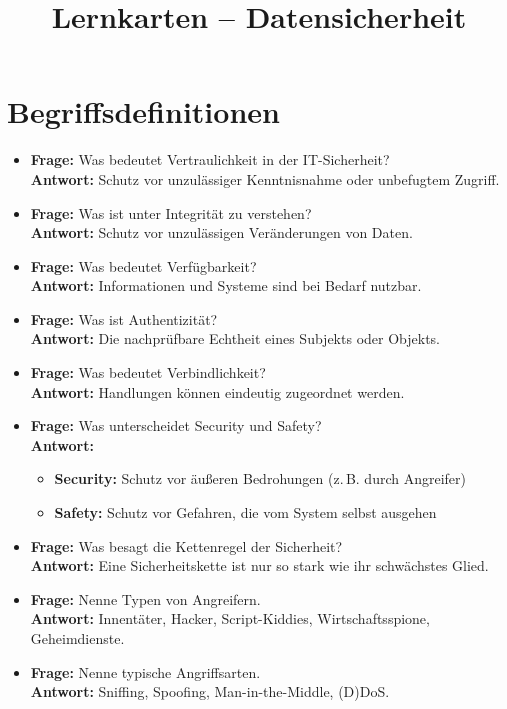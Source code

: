 \documentclass[a4paper,12pt]{article}
\title{Lernkarten – Datensicherheit}
\author{}
\date{}
\begin{document}
\maketitle

\section*{Begriffsdefinitionen}

\begin{itemize}[leftmargin=*]
  \item \textbf{Frage:} Was bedeutet Vertraulichkeit in der IT-Sicherheit?\\
  \textbf{Antwort:} Schutz vor unzulässiger Kenntnisnahme oder unbefugtem Zugriff.

  \item \textbf{Frage:} Was ist unter Integrität zu verstehen?\\
  \textbf{Antwort:} Schutz vor unzulässigen Veränderungen von Daten.

  \item \textbf{Frage:} Was bedeutet Verfügbarkeit?\\
  \textbf{Antwort:} Informationen und Systeme sind bei Bedarf nutzbar.

  \item \textbf{Frage:} Was ist Authentizität?\\
  \textbf{Antwort:} Die nachprüfbare Echtheit eines Subjekts oder Objekts.

  \item \textbf{Frage:} Was bedeutet Verbindlichkeit?\\
  \textbf{Antwort:} Handlungen können eindeutig zugeordnet werden.

  \item \textbf{Frage:} Was unterscheidet Security und Safety?\\
  \textbf{Antwort:} 
  \begin{itemize}
    \item \textbf{Security:} Schutz vor äußeren Bedrohungen (z. B. durch Angreifer)
    \item \textbf{Safety:} Schutz vor Gefahren, die vom System selbst ausgehen
  \end{itemize}

  \item \textbf{Frage:} Was besagt die Kettenregel der Sicherheit?\\
  \textbf{Antwort:} Eine Sicherheitskette ist nur so stark wie ihr schwächstes Glied.

  \item \textbf{Frage:} Nenne Typen von Angreifern.\\
  \textbf{Antwort:} Innentäter, Hacker, Script-Kiddies, Wirtschaftsspione, Geheimdienste.

  \item \textbf{Frage:} Nenne typische Angriffsarten.\\
  \textbf{Antwort:} Sniffing, Spoofing, Man-in-the-Middle, (D)DoS.
\end{itemize}
\end{document}
